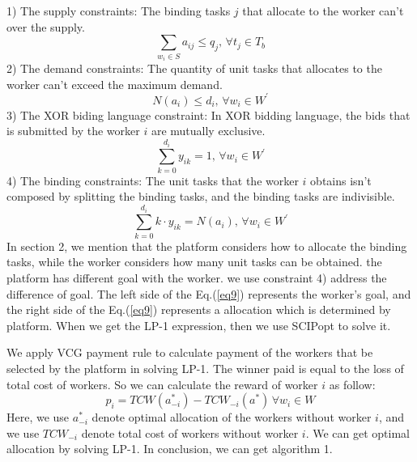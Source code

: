 1) The supply constraints: The binding tasks $j$ that allocate to the worker can't over the supply.
\begin{equation}\label{eq6}
  \sum_{w_i \in S}a_{ij} \leq q_j,\, \forall t_j \in T_b
\end{equation}
2) The demand constraints: The quantity of unit tasks that allocates to the worker can't exceed the maximum demand.
\begin{equation}\label{eq7}
  N(a_i) \leq d_i,\, \forall w_i \in W^{'}
\end{equation}
3) The XOR biding language constraint: In XOR bidding language, the bids that is submitted by the worker $i$ are mutually exclusive.
\begin{equation}\label{eq8}
  \sum_{k=0}^{d_i}y_{ik} = 1,\, \forall w_i \in W^{'}
\end{equation}
4) The binding constraints: The unit tasks that the worker $i$ obtains isn't composed by splitting the binding tasks, and the binding tasks are indivisible.
\begin{equation}\label{eq9}
  \sum_{k=0}^{d_i}k \cdot y_{ik} = N(a_i),\, \forall w_i \in W^{'}
\end{equation}
In section 2, we mention that the platform considers how to allocate the binding tasks, while the worker considers how many unit tasks can be obtained. the platform has different goal with the worker. we use constraint 4) address the difference of goal. The left side of the Eq.(\ref{eq9}) represents the worker's goal, and the right side of the Eq.(\ref{eq9}) represents a allocation which is determined by platform. When we get the LP-1 expression, then we use SCIPopt\cite{GleixnerEtal2018OO}\cite{DBLP:conf/icms/MaherMPRSS16} to solve it.

We apply VCG payment rule to calculate payment of the workers that be selected by the platform in solving LP-1. The winner paid is equal to the loss of total cost of workers. So we can calculate the reward of worker $i$ as follow:
\begin{equation}\label{eq10}
  p_i = TCW(a_{-i}^{\ast}) - TCW_{-i}(a^{\ast})\, \forall w_i \in W
\end{equation}
Here, we use $a_{-i}^{\ast}$ denote optimal allocation of the workers without worker $i$, and we use $TCW_{-i}$ denote total cost of workers without worker $i$. We can get optimal allocation by solving LP-1. In conclusion, we can get algorithm 1.

